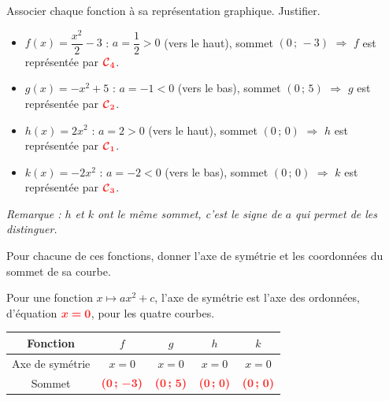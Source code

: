 \documentclass[11pt,a4paper]{book}
\begin{document}
\begin{enumMet}
	\item Associer chaque fonction à sa représentation graphique. Justifier.

	\begin{corrBox}
		\begin{itemize}
			\item $f(x)=\dfrac{x^2}{2}-3$ : $a=\dfrac{1}{2}>0$ (vers le haut), sommet $(0\,;\,-3)$ $\Rightarrow$ $f$ est représentée par $\mRouge{\mathcal{C}_4}$.
			\item $g(x)=-x^2+5$ : $a=-1<0$ (vers le bas), sommet $(0\,;\,5)$ $\Rightarrow$ $g$ est représentée par $\mRouge{\mathcal{C}_2}$.
			\item $h(x)=2x^2$ : $a=2>0$ (vers le haut), sommet $(0\,;\,0)$ $\Rightarrow$ $h$ est représentée par $\mRouge{\mathcal{C}_1}$.
			\item $k(x)=-2x^2$ : $a=-2<0$ (vers le bas), sommet $(0\,;\,0)$ $\Rightarrow$ $k$ est représentée par $\mRouge{\mathcal{C}_3}$.
		\end{itemize}
		\emph{Remarque : $h$ et $k$ ont le même sommet, c'est le signe de $a$ qui permet de les distinguer.}
	\end{corrBox}

	\item Pour chacune de ces fonctions, donner l'axe de symétrie et les coordonnées du sommet de sa courbe.

	\begin{corrBox}
		Pour une fonction $x\mapsto ax^2+c$, l'axe de symétrie est l'axe des ordonnées, d'équation $\mRouge{x=0}$, pour les quatre courbes.

		\begin{center}
			\setlength{\extrarowheight}{3pt}
			\begin{tabular}{|c|c|c|c|c|}
				\hline
				Fonction & $f$ & $g$ & $h$ & $k$ \\
				\hline
				Axe de symétrie & $x=0$ & $x=0$ & $x=0$ & $x=0$ \\
				\hline
				Sommet & $\mRouge{(0\,;\,-3)}$ & $\mRouge{(0\,;\,5)}$ & $\mRouge{(0\,;\,0)}$ & $\mRouge{(0\,;\,0)}$ \\
				\hline
			\end{tabular}
		\end{center}
	\end{corrBox}
\end{enumMet}

\newpage

\end{document}
